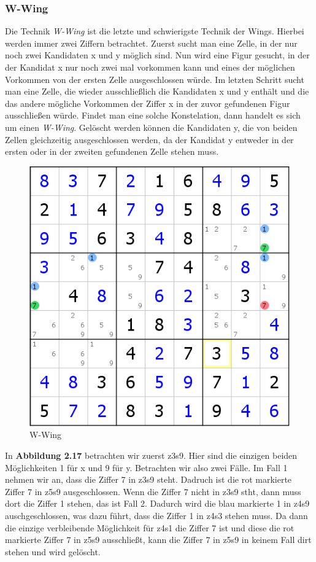 \newpage
\subsubsection{W-Wing}
Die Technik \textit{W-Wing} ist die letzte und schwierigste Technik der Wings. Hierbei werden immer zwei Ziffern betrachtet. Zuerst sucht man eine Zelle, in der nur noch zwei Kandidaten x und y möglich sind. Nun wird eine Figur gesucht, in der der Kandidat x nur noch zwei mal vorkommen kann und eines der möglichen Vorkommen von der ersten Zelle ausgeschlossen würde. Im letzten Schritt sucht man eine Zelle, die wieder ausschließlich die Kandidaten x und y enthält und die das andere mögliche Vorkommen der Ziffer x in der zuvor gefundenen Figur ausschließen würde. Findet man eine solche Konstelation, dann handelt es sich um einen \textit{W-Wing}. Gelöscht werden können die  Kandidaten y, die von beiden Zellen gleichzeitig ausgeschlossen werden, da der Kandidat y entweder in der ersten oder in der zweiten gefundenen Zelle stehen muss.

\begin{figure}[h]
\begin{center}
\includegraphics{./img/W_Wing.png}
\caption{W-Wing}
\end{center}
\end{figure}

In \textbf{Abbildung 2.17} betrachten wir zuerst z3s9. Hier sind die einzigen beiden Möglichkeiten 1 für x und 9 für y. Betrachten wir also zwei Fälle. Im Fall 1 nehmen wir an, dass die Ziffer 7 in z3s9 steht. Dadruch ist die rot markierte Ziffer 7 in z5s9 ausgeschlossen. Wenn die Ziffer 7 nicht in z3s9 stht, dann muss dort die Ziffer 1 stehen, das ist Fall 2. Dadurch wird die blau markierte 1 in z4s9 auschgeschlossen, was dazu führt, dass die Ziffer 1 in z4s3 stehen muss. Da dann die einzige verbleibende Möglichkeit für z4s1 die Ziffer 7 ist und diese die rot markierte Ziffer 7 in z5s9 ausschließt, kann die Ziffer 7 in z5s9 in keinem Fall dirt stehen und wird gelöscht.